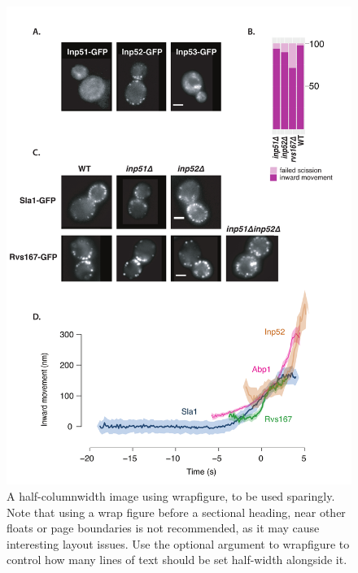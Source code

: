 \documentclass[9pt,lineno]{elife}
\begin{document}
\begin{figure}
	\includegraphics[width=\hsize]{figures/inp2}
	\caption{A half-columnwidth image using wrapfigure, to be used sparingly. Note that using a wrap figure before a sectional heading, near other floats or page boundaries is not recommended, as it may cause interesting layout issues. Use the optional argument to wrapfigure to control how many lines of text should be set half-width alongside it.}
	\label{fig:halfwidth}
\end{figure}
\end{document}

